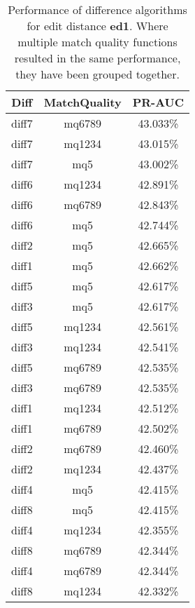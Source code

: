 \begin{table}[tbph]
\begin{center}
\begin{tabular}{|c|c||c|}
\hline
Diff & MatchQuality & PR-AUC  \\
\hline
\hline
diff7 & mq6789 & 43.033\% \\
diff7 & mq1234 & 43.015\% \\
diff7 & mq5 & 43.002\% \\
diff6 & mq1234 & 42.891\% \\
diff6 & mq6789 & 42.843\% \\
diff6 & mq5 & 42.744\% \\
diff2 & mq5 & 42.665\% \\
diff1 & mq5 & 42.662\% \\
diff5 & mq5 & 42.617\% \\
diff3 & mq5 & 42.617\% \\
diff5 & mq1234 & 42.561\% \\
diff3 & mq1234 & 42.541\% \\
diff5 & mq6789 & 42.535\% \\
diff3 & mq6789 & 42.535\% \\
diff1 & mq1234 & 42.512\% \\
diff1 & mq6789 & 42.502\% \\
diff2 & mq6789 & 42.460\% \\
diff2 & mq1234 & 42.437\% \\
diff4 & mq5 & 42.415\% \\
diff8 & mq5 & 42.415\% \\
diff4 & mq1234 & 42.355\% \\
diff8 & mq6789 & 42.344\% \\
diff4 & mq6789 & 42.344\% \\
diff8 & mq1234 & 42.332\% \\
\hline
\end{tabular}
\end{center}
\caption[Comparison of diff algorithms using edit distance \textbf{ed1}]{
  Performance of difference algorithms for
  edit distance \textbf{ed1}.  Where multiple match
  quality functions resulted in the same performance, they
  have been grouped together.}
\label{tab:editlongbyed1}
\end{table}
